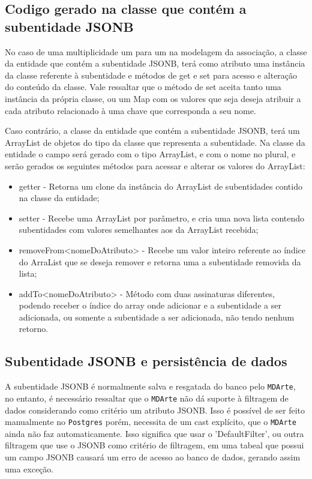 \subsection{Codigo gerado na classe que contém a subentidade JSONB}
No caso de uma multiplicidade um para um na modelagem da associação, a classe da
entidade que contém a subentidade JSONB, terá como atributo uma instância da
classe referente à subentidade e métodos de get e set para acesso e alteração do
conteúdo da classe. Vale ressaltar que o método de set aceita tanto uma
instância da própria classe, ou um Map com os valores que seja deseja atribuir a
cada atributo relacionado à uma chave que corresponda a seu nome.

Caso contrário, a classe da entidade que contém a subentidade JSONB, terá um
ArrayList de objetos do tipo da classe que representa a subentidade. Na classe
da entidade o campo será gerado com o tipo ArrayList, e com o nome no plural, e
serão gerados os seguintes métodos para acessar e alterar os valores do
ArrayList:

\begin{itemize}
  \item getter - Retorna um clone da instância do ArrayList de subentidades
  contido na classe da entidade;
  \item setter - Recebe uma ArrayList por parâmetro, e cria uma nova lista
  contendo subentidades com valores semelhantes aos da ArrayList recebida;
  \item removeFrom<nomeDoAtributo> - Recebe um valor inteiro referente ao índice
  do ArraList que se deseja remover e retorna uma a subentidade removida da
  lista;
  \item addTo<nomeDoAtributo> - Método com duas assinaturas diferentes, podendo
  receber o índice do array onde adicionar e a subentidade a ser adicionada, ou
  somente a subentidade a ser adicionada, não tendo nenhum retorno.
\end{itemize}

\subsection{Subentidade JSONB e persistência de dados}
A subentidade JSONB é normalmente salva e resgatada do banco pelo
\texttt{MDArte}, no entanto, é necessário ressaltar que o \texttt{MDArte} não dá
suporte à filtragem de dados considerando como critério um atributo JSONB. Isso
é possível de ser feito manualmente no \texttt{Postgres} porém, necessita de um
cast explícito, que o \texttt{MDArte} ainda não faz automaticamente. Isso
significa que usar o 'DefaultFilter', ou outra filtragem que use o JSONB
como critério de filtragem, em uma tabeal que possui um campo JSONB causará um
erro de acesso ao banco de dados, gerando assim uma exceção.

